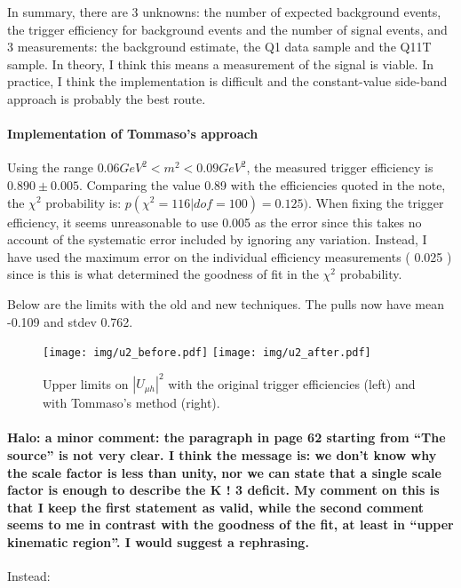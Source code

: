 \documentclass[12pt]{report}
\begin{document}
In summary, there are 3 unknowns: the number of expected background events, the trigger efficiency for background events and the number of signal events, and 3 measurements: the background estimate, the Q1 data sample and the Q11T sample.
In theory, I think this means a measurement of the signal is viable.
In practice, I think the implementation is difficult and the constant-value side-band approach is probably the best route.

\paragraph{Implementation of Tommaso's approach\\}
Using the range $0.06 GeV^2 < m^2 < 0.09 GeV^2$, the measured trigger efficiency is $0.890  \pm 0.005$.
Comparing the value 0.89 with the efficiencies quoted in the note, the $\chi^2$ probability is: $p( \chi^2 = 116 | dof = 100) = 0.125)$.
When fixing the trigger efficiency, it seems unreasonable to use 0.005 as the error 
since this takes no account of the systematic error included by ignoring any variation.
Instead, I have used the maximum error on the individual efficiency measurements ( 0.025 ) 
since is this is what determined the goodness of fit in the $\chi^2$ probability.

Below are the limits with the old and new techniques. The pulls now have mean -0.109 and stdev 0.762.

\begin{figure}[h!]
    \texttt{[image: img/u2\_before.pdf]}
    \texttt{[image: img/u2\_after.pdf]}
    \caption{Upper limits on $|U_{\mu h}|^2$ with the original trigger efficiencies (left) and with Tommaso's method (right).}
\end{figure}

\paragraphfont{\color{DarkOliveGreen4}}  %
\paragraph{Halo: a minor comment: the paragraph in page 62 starting from “The source” is not very clear. I
    think the message is: we don’t know why the scale factor is less than unity, nor we can state that
    a single scale factor is enough to describe the K ! 3 deficit. My comment on this is that I keep
    the first statement as valid, while the second comment seems to me in contrast with the goodness
of the fit, at least in “upper kinematic region”. I would suggest a rephrasing.\\}
Instead: \\
\end{document}
